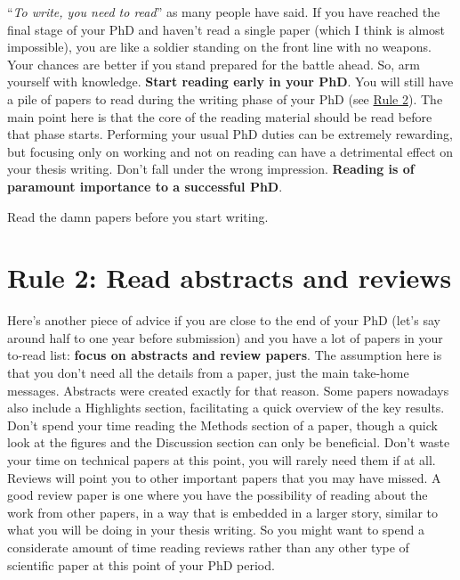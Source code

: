 \documentclass[
  12pt,
]{book}
\begin{document}
``\emph{To write, you need to read}'' as many people have said.
If you have reached the final stage of your PhD and haven't read a single paper (which I think is almost impossible), you are like a soldier standing on the front line with no weapons.
Your chances are better if you stand prepared for the battle ahead.
So, arm yourself with knowledge.
\textbf{Start reading early in your PhD}.
You will still have a pile of papers to read during the writing phase of your PhD (see \protect\hyperlink{rule2}{Rule 2}).
The main point here is that the core of the reading material should be read before that phase starts.
Performing your usual PhD duties can be extremely rewarding, but focusing only on working and not on reading can have a detrimental effect on your thesis writing.
Don't fall under the wrong impression.
\textbf{Reading is of paramount importance to a successful PhD}.

Read the damn papers before you start writing.

\hypertarget{rule2}{%
\section*{\texorpdfstring{\textbf{Rule 2:} Read abstracts and reviews}{Rule 2: Read abstracts and reviews}}\label{rule2}}

Here's another piece of advice if you are close to the end of your PhD (let's say around half to one year before submission) and you have a lot of papers in your to-read list: \textbf{focus on abstracts and review papers}.
The assumption here is that you don't need all the details from a paper, just the main take-home messages.
Abstracts were created exactly for that reason.
Some papers nowadays also include a Highlights section, facilitating a quick overview of the key results.
Don't spend your time reading the Methods section of a paper, though a quick look at the figures and the Discussion section can only be beneficial.
Don't waste your time on technical papers at this point, you will rarely need them if at all.
Reviews will point you to other important papers that you may have missed.
A good review paper is one where you have the possibility of reading about the work from other papers, in a way that is embedded in a larger story, similar to what you will be doing in your thesis writing.
So you might want to spend a considerate amount of time reading reviews rather than any other type of scientific paper at this point of your PhD period.
\end{document}
